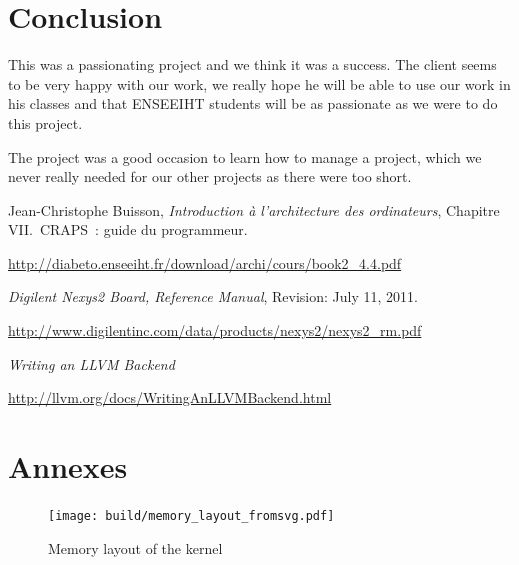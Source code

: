 \documentclass[openany, a4paper]{book}
\begin{document}
  \chapter{Conclusion}
    This was a passionating project and we think it was a success. The client
    seems to be very happy with our work, we really hope he will be able to use
    our work in his classes and that ENSEEIHT students will be as passionate as
    we were to do this project.

    The project was a good occasion to learn how to manage a project, which we
    never really needed for our other projects as there were too short.

  \setcounter{chapter}{0}
  \renewcommand{\thechapter}{\Alph{chapter}}

  \patchcmd{\thebibliography}{\chapter*}{\chapter}{}{}
  \begin{thebibliography}{9}
      Jean-Christophe Buisson,
      \emph{Introduction à l'architecture des ordinateurs},
      Chapitre VII.\ CRAPS~: guide du programmeur.

      \mbox{\url{http://diabeto.enseeiht.fr/download/archi/cours/book2_4.4.pdf}}

      \emph{Digilent Nexys2 Board, Reference Manual},
      Revision: July 11, 2011.

      \mbox{\url{http://www.digilentinc.com/data/products/nexys2/nexys2_rm.pdf}}

      \emph{Writing an LLVM Backend}

      \mbox{\url{http://llvm.org/docs/WritingAnLLVMBackend.html}}
  \end{thebibliography}

  \chapter{Annexes}
    \begin{figure}
      \centering
      \texttt{[image: build/memory\_layout\_fromsvg.pdf]}
      \caption{Memory layout of the kernel}\label{fig:memory}
    \end{figure}
\end{document}
